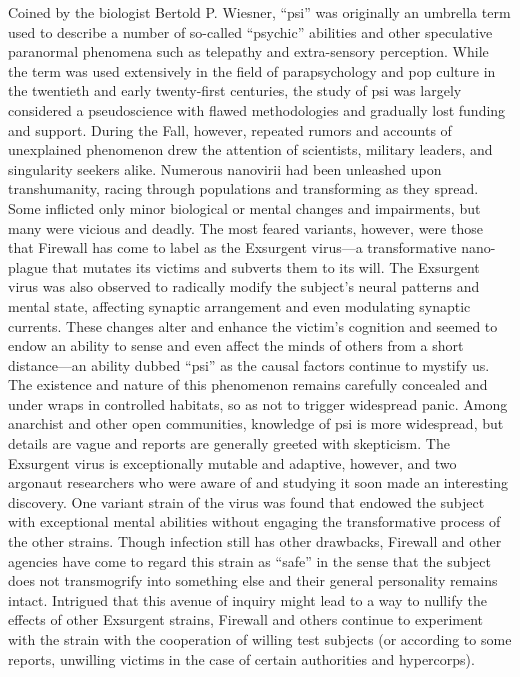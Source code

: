 Coined by the biologist Bertold P. Wiesner, “psi” was originally an umbrella term used to describe a number of so-called “psychic” abilities and other speculative paranormal phenomena such as telepathy and extra-sensory perception. While the term was used extensively in the field of parapsychology and pop culture in the twentieth and early twenty-first centuries, the study of psi was largely considered a pseudoscience with flawed methodologies and gradually lost funding and support. During the Fall, however, repeated rumors and accounts of unexplained phenomenon drew the attention of scientists, military leaders, and singularity seekers alike. Numerous nanovirii had been unleashed upon transhumanity, racing through populations and transforming as they spread. Some inflicted only minor biological or mental changes and impairments, but many were vicious and deadly. The most feared variants, however, were those that Firewall has come to label as the Exsurgent virus—a transformative nano-plague that mutates its victims and subverts them to its will. The Exsurgent virus was also observed to radically modify the subject’s neural patterns and mental state, affecting synaptic arrangement and even modulating synaptic currents. These changes alter and enhance the victim’s cognition and seemed to endow an ability to sense and even affect the minds of others from a short distance—an ability dubbed “psi” as the causal factors continue to mystify us. The existence and nature of this phenomenon remains carefully concealed and under wraps in controlled habitats, so as not to trigger widespread panic. Among anarchist and other open communities, knowledge of psi is more widespread, but details are vague and reports are generally greeted with skepticism. The Exsurgent virus is exceptionally mutable and adaptive, however, and two argonaut researchers who were aware of and studying it soon made an interesting discovery. One variant strain of the virus was found that endowed the subject with exceptional mental abilities without engaging the transformative process of the other strains. Though infection still has other drawbacks, Firewall and other agencies have come to regard this strain as “safe” in the sense that the subject does not transmogrify into something else and their general personality remains intact. Intrigued that this avenue of inquiry might lead to a way to nullify the effects of other Exsurgent strains, Firewall and others continue to experiment with the strain with the cooperation of willing test subjects (or according to some reports, unwilling victims in the case of certain authorities and hypercorps). 

